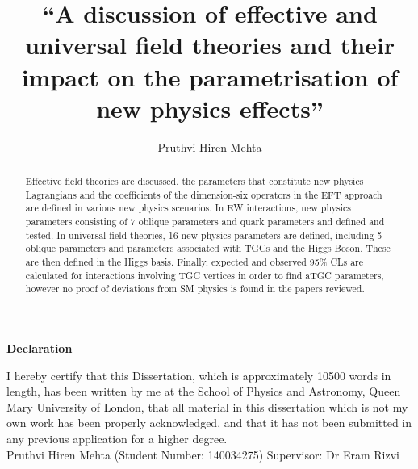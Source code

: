 \documentclass[11pt,oneside,a4paper]{article}
\begin{document}
\begin{center}
\textbf{Declaration}

I hereby certify that this Dissertation, which is approximately 10500  words in length, has been written by me at the School of Physics and Astronomy, Queen Mary University of London, that all material in this dissertation which is not my own work has been properly acknowledged, and  that it has not been submitted in any previous application for a higher degree.\\
\vspace{5mm} Pruthvi Hiren Mehta (Student Number: 140034275)
\newline
Supervisor: Dr Eram Rizvi
\end{center}
	
\title {“A discussion of effective and universal field theories and their impact on the parametrisation of new physics effects” }
\author{Pruthvi Hiren Mehta}


\maketitle


\begin{abstract}
Effective field theories are discussed, the parameters that constitute new physics Lagrangians and the coefficients of the dimension-six operators in the EFT approach are defined in various new physics scenarios. In EW interactions, new physics parameters consisting of 7 oblique parameters and quark parameters and defined and tested. In universal field theories, 16 new physics parameters are defined, including 5 oblique parameters and parameters associated with TGCs and the Higgs Boson. These are then defined in the Higgs basis. Finally, expected and observed 95\% CLs are calculated for interactions involving TGC vertices in order to find aTGC parameters, however no proof of deviations from SM physics is found in the papers reviewed. 
	
\end{abstract}
\newpage
\tableofcontents

\newpage
\end{document}
